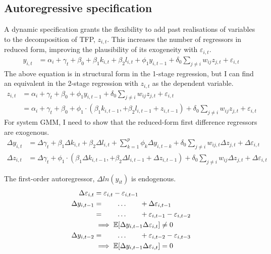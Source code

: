 \subsection{Autoregressive specification}

A dynamic specification grants the flexibility to add past realisations of variables
to the decomposition of TFP, $z_{i,t}$. This increases the number of regressors in reduced form,
improving the plausibility of its exogeneity with $\varepsilon_{i,t}$.
\begin{align}
    y_{i,t} &= \alpha_i + \gamma_t + \beta_0
                + \beta_1 k_{i,t}
                + \beta_2 l_{i,t}
                + \phi_1 y_{i,t-1}
                + \delta_0 \sum_{j\neq i} w_{ij}z_{j,t}
                + \varepsilon_{i,t}
\end{align}
The above equation is in structural form in the 1-stage regression,
but I can find an equivalent in the 2-stage regression with $z_{i,t}$ as the dependent variable.
\begin{align}
    z_{i,t} &= \alpha_i + \gamma_t + \beta_0
                + \phi_1 y_{i,t-1}
                + \delta_0 \sum_{j\neq i} w_{ij}z_{j,t}
                + \varepsilon_{i,t}
    \\
            &= \alpha_i + \gamma_t + \beta_0
                + \phi_1 \cdot (\beta_1 k_{i,t-1}, + \beta_2 l_{i,t-1} + z_{i,t-1})
                + \delta_0 \sum_{j\neq i} w_{ij}z_{j,t}
                + \varepsilon_{i,t}
\end{align}
For system GMM, I need to show that the reduced-form first difference regressors are exogenous.
\begin{align}
    \Delta y_{i,t} &= \Delta \gamma_t
                + \beta_1 \Delta k_{i,t}
                + \beta_2 \Delta l_{i,t}
                + \sum_{k=1}^p \phi_k \Delta y_{i,t-k}
                + \delta_0 \sum_{j\neq i} w_{ij,t} \Delta z_{j,t}
                + \Delta \varepsilon_{i,t}
    \\
    \Delta z_{i,t} &= \Delta\gamma_t
                + \phi_1 \cdot (\beta_1 \Delta k_{i,t-1}, + \beta_2 \Delta l_{i,t-1} + \Delta z_{i,t-1})
                + \delta_0 \sum_{j\neq i} w_{ij}\Delta z_{j,t}
                + \Delta \varepsilon_{i,t}
\end{align}

The first-order autoregressor, $\Delta ln(y_{it})$ is endogenous.
\begin{align}
    \Delta \varepsilon_{i,t} &= \varepsilon_{i,t} - \varepsilon_{i,t-1}
    \\ \notag
    \Delta y_{i,t-1} &= \qquad\dots\qquad + \Delta\varepsilon_{i,t-1}
    \\ \notag
    &= \qquad\dots\qquad + \varepsilon_{i,t-1} - \varepsilon_{i,t-2}
    \\ \notag
    &\implies \mathbb E[ \Delta y_{i,t-1}\Delta\varepsilon_{i,t}] \neq 0
    \\ \notag
    \Delta y_{i,t-2} &= \qquad\dots\qquad + \varepsilon_{i,t-2} - \varepsilon_{i,t-3}
    \\ \notag
    &\implies \mathbb E[ \Delta y_{i,t-1}\Delta\varepsilon_{i,t}] = 0
\end{align}

